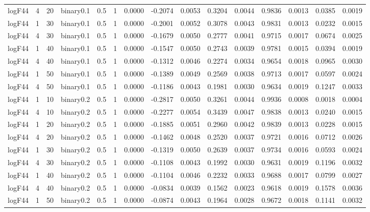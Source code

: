 \begin{longtable}{rrrrrrrrrrrrrrr}
  logF44 & 4 & 20 & binary0.1 & 0.5 & 1 & 0.0000 & -0.2074 & 0.0053 & 0.3204 & 0.0044 & 0.9836 & 0.0013 & 0.0385 & 0.0019 \\ 
  logF44 & 1 & 30 & binary0.1 & 0.5 & 1 & 0.0000 & -0.2001 & 0.0052 & 0.3078 & 0.0043 & 0.9831 & 0.0013 & 0.0232 & 0.0015 \\ 
  logF44 & 4 & 30 & binary0.1 & 0.5 & 1 & 0.0000 & -0.1679 & 0.0050 & 0.2777 & 0.0041 & 0.9715 & 0.0017 & 0.0674 & 0.0025 \\ 
  logF44 & 1 & 40 & binary0.1 & 0.5 & 1 & 0.0000 & -0.1547 & 0.0050 & 0.2743 & 0.0039 & 0.9781 & 0.0015 & 0.0394 & 0.0019 \\ 
  logF44 & 4 & 40 & binary0.1 & 0.5 & 1 & 0.0000 & -0.1312 & 0.0046 & 0.2274 & 0.0034 & 0.9654 & 0.0018 & 0.0965 & 0.0030 \\ 
  logF44 & 1 & 50 & binary0.1 & 0.5 & 1 & 0.0000 & -0.1389 & 0.0049 & 0.2569 & 0.0038 & 0.9713 & 0.0017 & 0.0597 & 0.0024 \\ 
  logF44 & 4 & 50 & binary0.1 & 0.5 & 1 & 0.0000 & -0.1186 & 0.0043 & 0.1981 & 0.0030 & 0.9634 & 0.0019 & 0.1247 & 0.0033 \\ 
  logF44 & 1 & 10 & binary0.2 & 0.5 & 1 & 0.0000 & -0.2817 & 0.0050 & 0.3261 & 0.0044 & 0.9936 & 0.0008 & 0.0018 & 0.0004 \\ 
  logF44 & 4 & 10 & binary0.2 & 0.5 & 1 & 0.0000 & -0.2277 & 0.0054 & 0.3439 & 0.0047 & 0.9838 & 0.0013 & 0.0240 & 0.0015 \\ 
  logF44 & 1 & 20 & binary0.2 & 0.5 & 1 & 0.0000 & -0.1885 & 0.0051 & 0.2960 & 0.0042 & 0.9839 & 0.0013 & 0.0228 & 0.0015 \\ 
  logF44 & 4 & 20 & binary0.2 & 0.5 & 1 & 0.0000 & -0.1462 & 0.0048 & 0.2520 & 0.0037 & 0.9721 & 0.0016 & 0.0712 & 0.0026 \\ 
  logF44 & 1 & 30 & binary0.2 & 0.5 & 1 & 0.0000 & -0.1319 & 0.0050 & 0.2639 & 0.0037 & 0.9734 & 0.0016 & 0.0593 & 0.0024 \\ 
  logF44 & 4 & 30 & binary0.2 & 0.5 & 1 & 0.0000 & -0.1108 & 0.0043 & 0.1992 & 0.0030 & 0.9631 & 0.0019 & 0.1196 & 0.0032 \\ 
  logF44 & 1 & 40 & binary0.2 & 0.5 & 1 & 0.0000 & -0.1104 & 0.0046 & 0.2232 & 0.0033 & 0.9688 & 0.0017 & 0.0799 & 0.0027 \\ 
  logF44 & 4 & 40 & binary0.2 & 0.5 & 1 & 0.0000 & -0.0834 & 0.0039 & 0.1562 & 0.0023 & 0.9618 & 0.0019 & 0.1578 & 0.0036 \\ 
  logF44 & 1 & 50 & binary0.2 & 0.5 & 1 & 0.0000 & -0.0874 & 0.0043 & 0.1964 & 0.0028 & 0.9672 & 0.0018 & 0.1141 & 0.0032 \\ 

\end{longtable}
